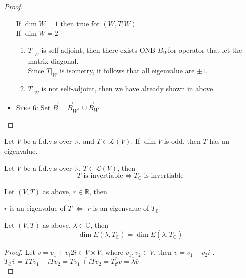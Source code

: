 \documentclass{aq-notes}
\begin{document}
\begin{theorem}
\begin{proof}
\begin{itemize}
                If $\dim W = 1$ then true for $(W, T\vert W)$\\
                If $\dim W = 2$
                \begin{enumerate}
                    \item $T\vert_W$ is self-adjoint, then there exists ONB $B_W$for operator that let the matrix diagonal.\\
                        Since $T\vert_W$ is isometry, it follows that all eigenvalue are $\pm 1$.
                    \item $T\vert_W$ is not self-adjoint, then we have already shown in above.
                \end{enumerate}
        \item {\scshape Step 6}: 
                Set $\vec B = \vec B_{W^\perp} \cup \vec B_W$
\end{itemize}
        \end{proof}
    \end{theorem}
    \begin{theorem}
        Let $V$ be a f.d.v.s over $\mathbb{R}$, and $T\in \mathcal{L}(V)$. If $\dim V$ is odd, then $T$ has an eigenvalue.
    \end{theorem}
    \begin{lemma}
    Let $V$ be a f.d.v.s over $\mathbb{R}$, $T\in \mathcal{L}(V)$, then
    \[T \mbox{ is invertiable} \iff T_\mathbb{C} \mbox{ is invertiable}\]
    \end{lemma}
    \begin{lemma}
    Let $(V, T)$ as above, $r\in \mathbb{R}$, then
    \end{lemma}
    \begin{lemma} 
    \begin{center}
            $r$ is an eigenvalue of $T$  $\iff$ $r$ is an eigenvalue of $T_\mathbb{C}$
        \end{center}
    \end{lemma}
        \begin{lemma}
        Let $(V, T)$ as above, $\lambda\in \mathbb{C}$, then
            \[\dim E(\lambda, T_\mathbb{C}) = \dim E(\overline{\lambda}, T_\mathbb{C})\]
    \end{lemma}
    \begin{proof}
        Let $v = v_1+v_i2i\in V\times V$, where $v_1,v_2\in V$, then $\overline{v} = v_1-v_2i$ .\\
        $T_\mathcal{C}\overline{v} = TTv_1-iTv_2 = \overline{Tv_1+iTv_2} = \overline{T_\mathcal{C}v} = \overline{\lambda}\overline{v}$\\
    \end{proof}
\end{document}
